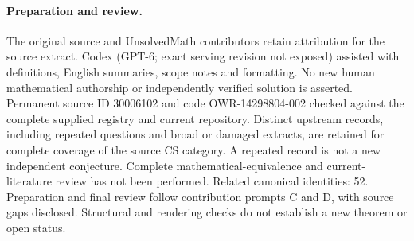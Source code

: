 \documentclass[11pt]{article}
\begin{document}
\paragraph{Preparation and review.}
The original source and UnsolvedMath contributors retain attribution for the source extract. Codex (GPT-6; exact serving revision not exposed) assisted with definitions, English summaries, scope notes and formatting. No new human mathematical authorship or independently verified solution is asserted. Permanent source ID 30006102 and code OWR-14298804-002 checked against the complete supplied registry and current repository. Distinct upstream records, including repeated questions and broad or damaged extracts, are retained for complete coverage of the source CS category. A repeated record is not a new independent conjecture. Complete mathematical-equivalence and current-literature review has not been performed. Related canonical identities: 52. Preparation and final review follow contribution prompts C and D, with source gaps disclosed. Structural and rendering checks do not establish a new theorem or open status.
\label{end:30006102}
\end{document}
